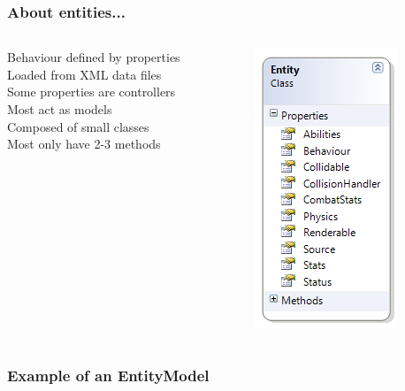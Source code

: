 \documentclass[screen]{beamer}
\begin{document}
\begin{frame}
  \frametitle{About entities...}
  \begin{columns}
    \begin{column}{0.6\linewidth}
      Behaviour defined by properties\\
      Loaded from XML data files\\
      Some properties are controllers\\
      Most act as models\\
      Composed of small classes\\
      Most only have 2-3 methods\\
    \end{column}
    \begin{column}{0.4\linewidth}
      \includegraphics[scale=0.7]{../reports/graphics/entity}
    \end{column}
  \end{columns}
\end{frame}

\begin{frame}
  \frametitle{Example of an EntityModel}
  
\end{frame}
\end{document}

